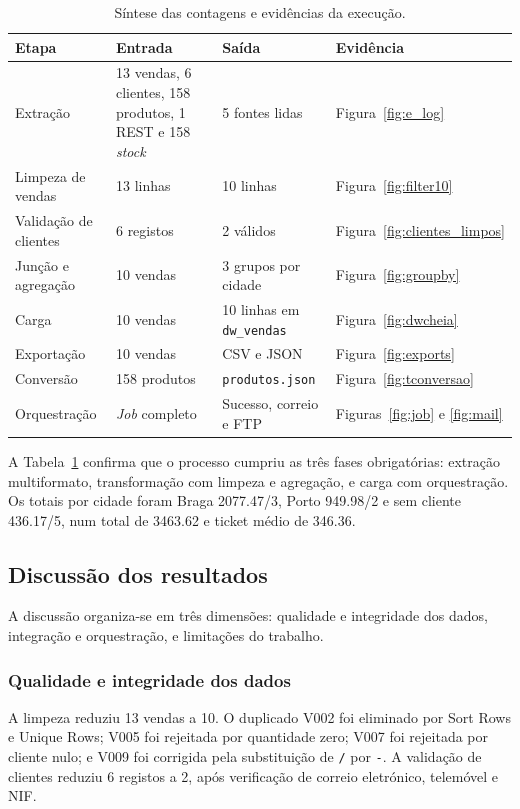 \documentclass[11pt,a4paper]{article}
\begin{document}
\begin{table}[H]
\centering
\small
\begin{tabular}{|p{2.6cm}|p{4.0cm}|p{3.4cm}|p{3.0cm}|}
\hline
Etapa & Entrada & Saída & Evidência \\ \hline
Extração & 13 vendas, 6 clientes, 158 produtos, 1 REST e 158 \textit{stock} & 5 fontes lidas & Figura~\ref{fig:e_log} \\ \hline
Limpeza de vendas & 13 linhas & 10 linhas & Figura~\ref{fig:filter10} \\ \hline
Validação de clientes & 6 registos & 2 válidos & Figura~\ref{fig:clientes_limpos} \\ \hline
Junção e agregação & 10 vendas & 3 grupos por cidade & Figura~\ref{fig:groupby} \\ \hline
Carga & 10 vendas & 10 linhas em \texttt{dw\_vendas} & Figura~\ref{fig:dwcheia} \\ \hline
Exportação & 10 vendas & CSV e JSON & Figura~\ref{fig:exports} \\ \hline
Conversão & 158 produtos & \texttt{produtos.json} & Figura~\ref{fig:tconversao} \\ \hline
Orquestração & \textit{Job} completo & Sucesso, correio e FTP & Figuras~\ref{fig:job} e \ref{fig:mail} \\ \hline
\end{tabular}
\caption{Síntese das contagens e evidências da execução.}
\label{tab:resultados}
\end{table}

A Tabela~\ref{tab:resultados} confirma que o processo cumpriu as três fases obrigatórias: extração multiformato, transformação com limpeza e agregação, e carga com orquestração. Os totais por cidade foram Braga 2077.47/3, Porto 949.98/2 e sem cliente 436.17/5, num total de 3463.62 e ticket médio de 346.36.

\subsection{Discussão dos resultados}
A discussão organiza-se em três dimensões: qualidade e integridade dos dados, integração e orquestração, e limitações do trabalho.

\subsubsection{Qualidade e integridade dos dados}
A limpeza reduziu 13 vendas a 10. O duplicado V002 foi eliminado por Sort Rows e Unique Rows; V005 foi rejeitada por quantidade zero; V007 foi rejeitada por cliente nulo; e V009 foi corrigida pela substituição de \texttt{/} por \texttt{-}. A validação de clientes reduziu 6 registos a 2, após verificação de correio eletrónico, telemóvel e NIF.
\end{document}

